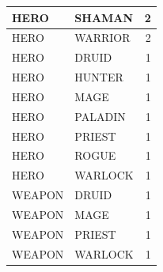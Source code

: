 \documentclass[]{article}
\begin{document}
\begin{tabular}{l|l|r}
HERO & SHAMAN & 2\\
\hline
HERO & WARRIOR & 2\\
\hline
HERO & DRUID & 1\\
\hline
HERO & HUNTER & 1\\
\hline
HERO & MAGE & 1\\
\hline
HERO & PALADIN & 1\\
\hline
HERO & PRIEST & 1\\
\hline
HERO & ROGUE & 1\\
\hline
HERO & WARLOCK & 1\\
\hline
WEAPON & DRUID & 1\\
\hline
WEAPON & MAGE & 1\\
\hline
WEAPON & PRIEST & 1\\
\hline
WEAPON & WARLOCK & 1\\
\hline
\end{tabular}
\end{document}
